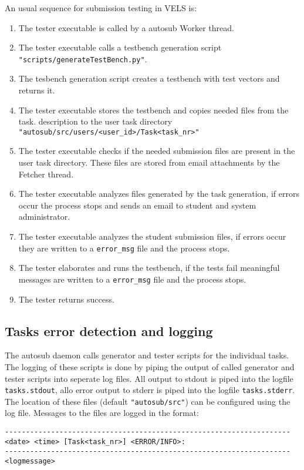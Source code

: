 An usual sequence for submission testing in VELS is:
\begin{enumerate}
\item The tester executable is called by a autosub Worker thread.
\item The tester executable calls a testbench generation script
    {\tt "scripts/generateTestBench.py"}.
\item The tesbench generation script creates a testbench with test vectors and returns it.
\item The tester executable stores the testbench and copies needed files from the task.
    description to the user task directory {\tt "autosub/src/users/<user\_id>/Task<task\_nr>"}
\item The tester executable checks if the needed submission files are present in the
	user task directory. These files are stored from email attachments by the Fetcher thread.
\item The tester executable analyzes files generated by the task generation, if errors
    occur the process stops and sends an email to student and system administrator.
\item The tester executable analyzes the student submission files, if errors occur they
    are written to a {\tt error\_msg} file and the process stops.
\item The tester elaborates and runs the testbench, if the tests fail meaningful messages
    are written to a {\tt error\_msg} file and the process stops.
\item The tester returns success.
\end{enumerate}

\subsection{Tasks error detection and logging} \label{tasklog}
The autosub daemon calls generator and tester scripts for the individual tasks. The logging 
of these scripts is done by piping the output of called generator and tester scripts into 
seperate log files. All output to stdout is piped into the logfile {\tt tasks.stdout}, allo 
error output to stderr is piped into the logfile {\tt tasks.stderr}. The location of these
files (default {\tt "autosub/src"}) can be configured using the log file. Messages to the 
files are logged in the format:
\begin{verbatim}
--------------------------------------------------------------------
<date> <time> [Task<task_nr>] <ERROR/INFO>:
--------------------------------------------------------------------
<logmessage>
\end{verbatim}


